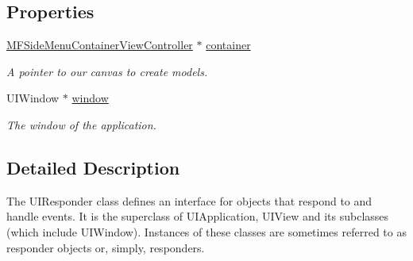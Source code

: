 \subsection*{Properties}
\begin{DoxyCompactItemize}
\item 
\hypertarget{interface_app_delegate_a26c59ea8851d81cef0871b61ce2e1b43}{\hyperlink{interface_m_f_side_menu_container_view_controller}{M\-F\-Side\-Menu\-Container\-View\-Controller} $\ast$ \hyperlink{interface_app_delegate_a26c59ea8851d81cef0871b61ce2e1b43}{container}}\label{interface_app_delegate_a26c59ea8851d81cef0871b61ce2e1b43}

\begin{DoxyCompactList}\small\item\em A pointer to our canvas to create models. \end{DoxyCompactList}\item 
\hypertarget{interface_app_delegate_ae04748cdefebda525b266731b6c120a2}{U\-I\-Window $\ast$ \hyperlink{interface_app_delegate_ae04748cdefebda525b266731b6c120a2}{window}}\label{interface_app_delegate_ae04748cdefebda525b266731b6c120a2}

\begin{DoxyCompactList}\small\item\em The window of the application. \end{DoxyCompactList}\end{DoxyCompactItemize}


\subsection{Detailed Description}
The U\-I\-Responder class defines an interface for objects that respond to and handle events. It is the superclass of U\-I\-Application, U\-I\-View and its subclasses (which include U\-I\-Window). Instances of these classes are sometimes referred to as responder objects or, simply, responders. 

